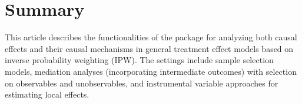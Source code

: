 \documentclass[nojss]{jss}
\begin{document}
\section{Summary}\label{summary}

This article describes the functionalities of the  package for analyzing both causal effects and their causal mechanisms in general treatment effect models based on inverse probability weighting (IPW). The settings include sample selection models, mediation analyses (incorporating intermediate outcomes) with selection on observables and unobservables, and instrumental variable approaches for estimating local effects. %


\end{document}
